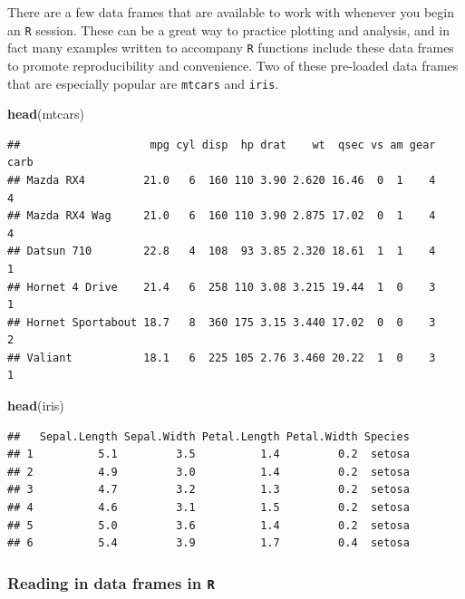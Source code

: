 \documentclass[]{book}
\newenvironment{Shaded}{\begin{snugshade}}{\end{snugshade}}
\newcommand{\KeywordTok}[1]{\textcolor[rgb]{0.13,0.29,0.53}{\textbf{#1}}}
\newcommand{\NormalTok}[1]{#1}
\begin{document}
There are a few data frames that are available to work with whenever you begin an \texttt{R} session. These can be a great way to practice plotting and analysis, and in fact many examples written to accompany \texttt{R} functions include these data frames to promote reproducibility and convenience. Two of these pre-loaded data frames that are especially popular are \texttt{mtcars} and \texttt{iris}.

\begin{Shaded}
\begin{Highlighting}[]
\KeywordTok{head}\NormalTok{(mtcars)}
\end{Highlighting}
\end{Shaded}

\begin{verbatim}
##                    mpg cyl disp  hp drat    wt  qsec vs am gear carb
## Mazda RX4         21.0   6  160 110 3.90 2.620 16.46  0  1    4    4
## Mazda RX4 Wag     21.0   6  160 110 3.90 2.875 17.02  0  1    4    4
## Datsun 710        22.8   4  108  93 3.85 2.320 18.61  1  1    4    1
## Hornet 4 Drive    21.4   6  258 110 3.08 3.215 19.44  1  0    3    1
## Hornet Sportabout 18.7   8  360 175 3.15 3.440 17.02  0  0    3    2
## Valiant           18.1   6  225 105 2.76 3.460 20.22  1  0    3    1
\end{verbatim}

\begin{Shaded}
\begin{Highlighting}[]
\KeywordTok{head}\NormalTok{(iris)}
\end{Highlighting}
\end{Shaded}

\begin{verbatim}
##   Sepal.Length Sepal.Width Petal.Length Petal.Width Species
## 1          5.1         3.5          1.4         0.2  setosa
## 2          4.9         3.0          1.4         0.2  setosa
## 3          4.7         3.2          1.3         0.2  setosa
## 4          4.6         3.1          1.5         0.2  setosa
## 5          5.0         3.6          1.4         0.2  setosa
## 6          5.4         3.9          1.7         0.4  setosa
\end{verbatim}

\hypertarget{reading-in-data-frames-in-r}{%
\subsubsection{\texorpdfstring{Reading in data frames in \texttt{R}}{Reading in data frames in R}}\label{reading-in-data-frames-in-r}}
\end{document}
